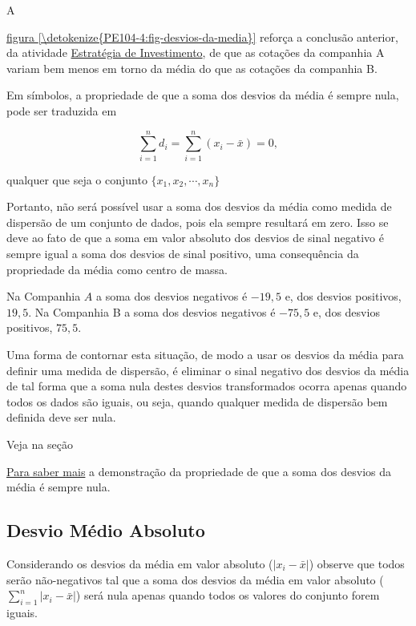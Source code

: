 A {\hyperref[\detokenize{PE104-4:fig-desvios-da-media}]{figura \ref{\detokenize{PE104-4:fig-desvios-da-media}}} reforça a conclusão anterior, da atividade \hyperref[\detokenize{PE104-3:ativ-estrategia-de-investimento}]{Estratégia de Investimento}, de que as cotações da companhia A variam bem menos em torno da média do que as cotações da companhia B.

\needspace{.2\textheight}
Em símbolos, a propriedade de que a soma dos desvios da média é sempre nula, pode ser traduzida em

\begin{equation*}
\displaystyle{\sum^n_{i=1}} d_i=\displaystyle{\sum^n_{i=1}} (x_i-\bar{x})=0,
\end{equation*}

qualquer que seja o conjunto \(\{ x_1,x_2,\cdots, x_n\}\)

Portanto, não será possível usar a soma dos desvios da média como medida de dispersão de um conjunto de dados, pois ela sempre resultará em zero. Isso se deve ao fato de que a soma em valor absoluto dos desvios de sinal negativo é sempre igual a soma dos desvios de sinal positivo, uma consequência da propriedade da média como centro de massa.

Na Companhia $A$ a soma dos desvios negativos é $-19{,}5$ e, dos desvios positivos, $19{,}5$. Na Companhia B a soma dos desvios negativos é $-75{,}5$ e, dos desvios positivos, $75{,}5$.

Uma forma de contornar esta situação, de modo a usar os desvios da média para definir uma medida de dispersão, é eliminar o sinal negativo dos desvios da média de tal forma que a soma nula destes desvios transformados ocorra apenas quando todos os dados são iguais, ou seja, quando qualquer medida de dispersão bem definida deve ser nula.



Veja na seção {\hyperref[\detokenize{PE104-A:sec-para-saber-mais}]{Para saber mais} a demonstração da propriedade de que a soma dos desvios da média é sempre nula.

\subsection{Desvio Médio Absoluto}

Considerando os desvios da média em valor absoluto (\(|x_i-\bar{x}|\)) observe que todos serão não-negativos tal que a soma dos desvios da média em valor absoluto (\(\displaystyle{\sum^n_{i=1}}|x_i-\bar{x}|\)) será nula apenas quando todos os valores do conjunto forem iguais.

}}
